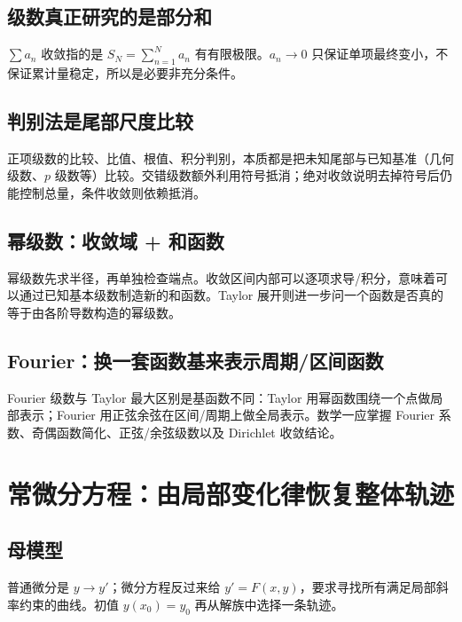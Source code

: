 \documentclass[11pt,a4paper,openany]{ctexbook}
\begin{document}
\section{级数真正研究的是部分和}
$\sum a_n$ 收敛指的是 $S_N=\sum_{n=1}^Na_n$ 有有限极限。$a_n\to0$ 只保证单项最终变小，不保证累计量稳定，所以是必要非充分条件。

\section{判别法是尾部尺度比较}
正项级数的比较、比值、根值、积分判别，本质都是把未知尾部与已知基准（几何级数、$p$ 级数等）比较。交错级数额外利用符号抵消；绝对收敛说明去掉符号后仍能控制总量，条件收敛则依赖抵消。

\section{幂级数：收敛域 + 和函数}
幂级数先求半径，再单独检查端点。收敛区间内部可以逐项求导/积分，意味着可以通过已知基本级数制造新的和函数。Taylor 展开则进一步问一个函数是否真的等于由各阶导数构造的幂级数。

\section{Fourier：换一套函数基来表示周期/区间函数}
Fourier 级数与 Taylor 最大区别是基函数不同：Taylor 用幂函数围绕一个点做局部表示；Fourier 用正弦余弦在区间/周期上做全局表示。数学一应掌握 Fourier 系数、奇偶函数简化、正弦/余弦级数以及 Dirichlet 收敛结论。

\chapter{常微分方程：由局部变化律恢复整体轨迹}
\section{母模型}
普通微分是 $y\to y'$；微分方程反过来给 $y'=F(x,y)$，要求寻找所有满足局部斜率约束的曲线。初值 $y(x_0)=y_0$ 再从解族中选择一条轨迹。
\end{document}
